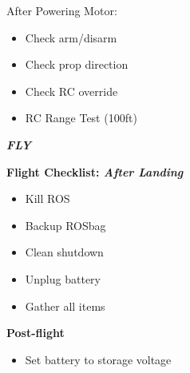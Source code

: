 \documentclass[]{auvsi_doc}
\begin{document}
After Powering Motor:

\begin{itemize}
	\item Check arm/disarm
	\item Check prop direction
	\item Check RC override
	\item RC Range Test (100ft) 
\end{itemize}

\hrulefill

\textit{\textbf{FLY}}

\hrulefill

\textbf{Flight Checklist: \textit{After Landing}}
\begin{itemize}
	\item Kill ROS
	\item Backup ROSbag
	\item Clean shutdown
	\item Unplug battery
	\item Gather all items
\end{itemize}

\hrulefill

\textbf{Post-flight}
\begin{itemize}
	\item Set battery to storage voltage
\end{itemize}
\end{document}
